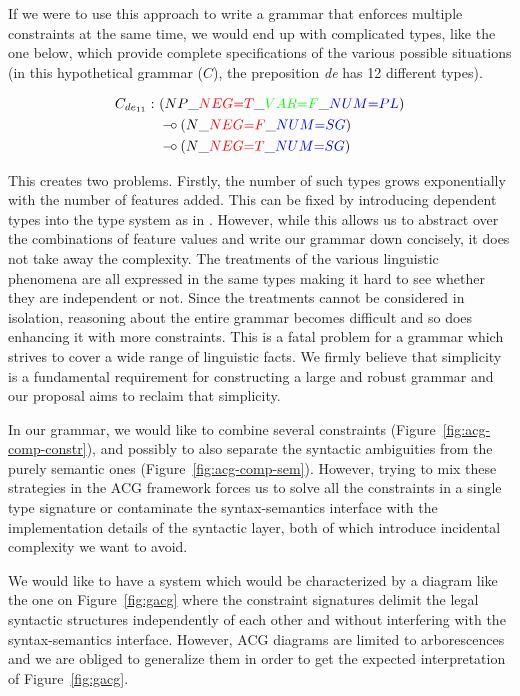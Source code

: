\documentclass{llncs}
\def\limp {\mathbin{{-}\mkern-3.5mu{\circ}}}
\begin{document}
If we were to use this approach to write a grammar that enforces multiple
constraints at the same time, we would end up with complicated types, like the
one below, which provide complete specifications of the various possible
situations (in this hypothetical grammar ($C$), the preposition \emph{de} has
12 different types).

\begin{align*}
C_{de_{11}} :\ &(NP\_\textcolor{red}{NEG{=}T}\_\textcolor{green}{VAR{=}F}\_\textcolor{blue}{NUM{=}PL}) \\
&\limp (N\_\textcolor{red}{NEG{=}F}\_\textcolor{blue}{NUM{=}SG}) \\
&\limp (N\_\textcolor{red}{NEG{=}T}\_\textcolor{blue}{NUM{=}SG})
\end{align*}

This creates two problems. Firstly, the number of such types grows
exponentially with the number of features added. This can be fixed by
introducing dependent types into the type system as in
\cite{de2007type}. However, while this allows us to abstract over the
combinations of feature values and write our grammar down concisely, it does
not take away the complexity. The treatments of the various linguistic
phenomena are all expressed in the same types making it hard to see whether
they are independent or not. Since the treatments cannot be considered in
isolation, reasoning about the entire grammar becomes difficult and so does
enhancing it with more constraints. This is a fatal problem for a grammar
which strives to cover a wide range of linguistic facts. We firmly believe
that simplicity is a fundamental requirement for constructing a large and
robust grammar and our proposal aims to reclaim that simplicity.

In our grammar, we would like to combine several constraints
(Figure~\ref{fig:acg-comp-constr}), and possibly to also separate the
syntactic ambiguities from the purely semantic ones
(Figure~\ref{fig:acg-comp-sem}).  However, trying to mix these strategies in
the ACG framework forces us to solve all the constraints in a single type
signature or contaminate the syntax-semantics interface with the
implementation details of the syntactic layer, both of which introduce
incidental complexity we want to avoid.

We would like to have a system which would be characterized by a diagram like
the one on Figure~\ref{fig:gacg} where the constraint signatures delimit the
legal syntactic structures independently of each other and without interfering
with the syntax-semantics interface. However, ACG diagrams are limited to
arborescences and we are obliged to generalize them in order to get
the expected interpretation of Figure~\ref{fig:gacg}.
\end{document}
